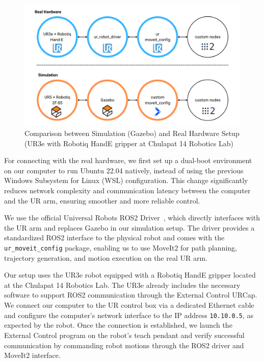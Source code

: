 \documentclass[12pt]{extarticle}
\begin{document}
\begin{figure}[h]
\centering
\includegraphics[width=\linewidth]{images/sim_vs_real.png}
\caption{Comparison between Simulation (Gazebo) and Real Hardware Setup (UR3e with Robotiq HandE gripper at Chulapat 14 Robotics Lab)}
\label{fig: sim-vs-real}
\end{figure}

For connecting with the real hardware, we first set up a dual-boot environment on our computer to run Ubuntu 22.04 natively, instead of using the previous Windows Subsystem for Linux (WSL) configuration. This change significantly reduces network complexity and communication latency between the computer and the UR arm, ensuring smoother and more reliable control.

We use the official Universal Robots ROS2 Driver~\cite{ur_ros2_driver}, which directly interfaces with the UR arm and replaces Gazebo in our simulation setup. The driver provides a standardized ROS2 interface to the physical robot and comes with the \texttt{ur\_moveit\_config} package, enabling us to use MoveIt2 for path planning, trajectory generation, and motion execution on the real UR arm.

Our setup uses the UR3e robot equipped with a Robotiq HandE gripper located at the Chulapat 14 Robotics Lab. The UR3e already includes the necessary software to support ROS2 communication through the External Control URCap. We connect our computer to the UR control box via a dedicated Ethernet cable and configure the computer’s network interface to the IP address \texttt{10.10.0.5}, as expected by the robot. Once the connection is established, we launch the External Control program on the robot’s teach pendant and verify successful communication by commanding robot motions through the ROS2 driver and MoveIt2 interface.
\end{document}
